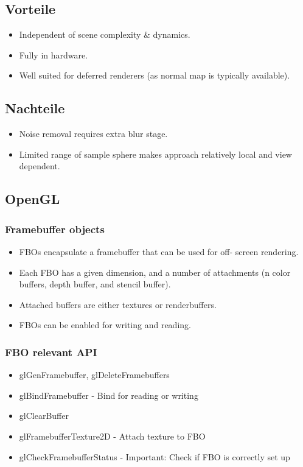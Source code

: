 \documentclass[10pt]{article}
\begin{document}
\subsection{Vorteile}
\begin{itemize}
	\item Independent of scene complexity \& dynamics.
	\item Fully in hardware.
	\item Well suited for deferred renderers (as normal map is typically available).
\end{itemize}
\subsection{Nachteile}
\begin{itemize}
	\item Noise removal requires extra blur stage.
	\item Limited range of sample sphere makes approach relatively local and view dependent.
\end{itemize}
\subsection{OpenGL}
\subsubsection{Framebuffer objects}
\begin{itemize}
	\item FBOs encapsulate a framebuffer that can be used for off- screen rendering.
	\item Each FBO has a given dimension, and a number of attachments (n color buffers, depth buffer, and stencil buffer).
	\item Attached buffers are either textures or renderbuffers. 
	\item FBOs can be enabled for writing and reading.
\end{itemize}
\subsubsection{FBO relevant API}
\begin{itemize}
	\item glGenFramebuffer, glDeleteFramebuffers
	\item glBindFramebuffer - Bind for reading or writing
	\item glClearBuffer
	\item glFramebufferTexture2D - Attach texture to FBO
	\item glCheckFramebufferStatus -  Important: Check if FBO is correctly set up
\end{itemize}
\end{document}
